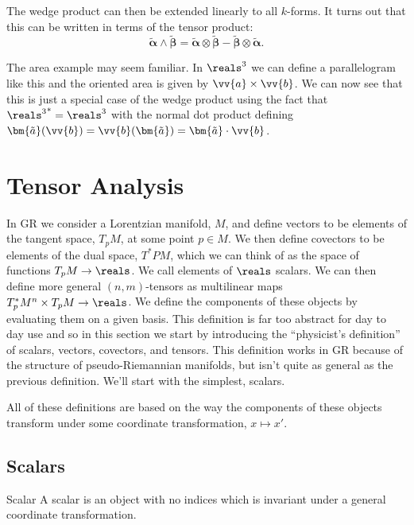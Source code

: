 \documentclass[fleqn]{NotesClass}
\newcommand*{\cv}[1]{\bm{\tilde{#1}}}
\begin{document}
    The wedge product can then be extended linearly to all \(k\)-forms.
    It turns out that this can be written in terms of the tensor product:
    \begin{equation}
        \cv{\alpha} \wedge \cv{\beta} = \cv{\alpha} \otimes \cv{\beta} - \cv{\beta} \otimes \cv{\alpha}.
    \end{equation}
    
    The area example may seem familiar.
    In \(\reals^3\) we can define a parallelogram like this and the oriented area is given by \(\vv{a} \times \vv{b}\).
    We can now see that this is just a special case of the wedge product using the fact that \({\reals^3}^* = \reals^3\) with the normal dot product defining \(\cv{a}(\vv{b}) = \vv{b}(\cv{a}) = \cv{a} \cdot \vv{b}\).
    
    \chapter{Tensor Analysis}
    In GR we consider a Lorentzian manifold, \(M\), and define vectors to be elements of the tangent space, \(T_pM\), at some point \(p \in M\).
    We then define covectors to be elements of the dual space, \(T^*PM\), which we can think of as the space of functions \(T_pM \to \reals\).
    We call elements of \(\reals\) scalars.
    We can then define more general \((n, m)\)-tensors as multilinear maps \(T_p^*M^n \times T_pM \to \reals\).
    We define the components of these objects by evaluating them on a given basis.
    This definition is far too abstract for day to day use and so in this section we start by introducing the \enquote{physicist's definition} of scalars, vectors, covectors, and tensors.
    This definition works in GR because of the structure of pseudo-Riemannian manifolds, but isn't quite as general as the previous definition.
    We'll start with the simplest, scalars.
    
    All of these definitions are based on the way the components of these objects transform under some coordinate transformation, \(x \mapsto x'\).
    
    \section{Scalars}
    \begin{dfn}{Scalar}{}
        A scalar is an object with no indices which is invariant under a general coordinate transformation.
    \end{dfn}
    
\end{document}
